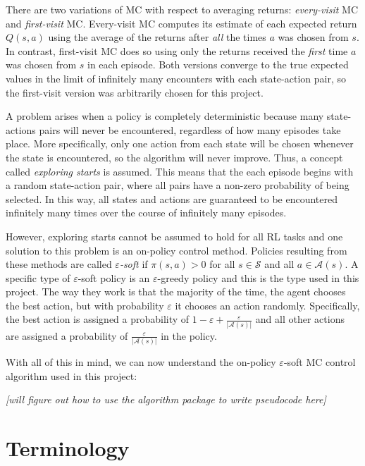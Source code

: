 \documentclass[11pt,a4paper]{report}
\begin{document}
There are two variations of MC with respect to averaging returns: \emph{every-visit} MC and \emph{first-visit} MC. Every-visit MC computes its estimate of each expected return $Q(s,a)$ using the average of the returns after \emph{all} the times $a$ was chosen from $s$. In contrast, first-visit MC does so using only the returns received the \emph{first} time $a$ was chosen from $s$ in each episode. Both versions converge to the true expected values in the limit of infinitely many encounters with each state-action pair, so the first-visit version was arbitrarily chosen for this project.

A problem arises when a policy is completely deterministic because many state-actions pairs will never be encountered, regardless of how many episodes take place. More specifically, only one action from each state will be chosen whenever the state is encountered, so the algorithm will never improve. Thus, a concept called \emph{exploring starts} is assumed. This means that the each episode begins with a random state-action pair, where all pairs have a non-zero probability of being selected. In this way, all states and actions are guaranteed to be encountered infinitely many times over the course of infinitely many episodes.

However, exploring starts cannot be assumed to hold for all RL tasks and one solution to this problem is an on-policy control method. Policies resulting from these methods are called \emph{$\varepsilon$-soft} if $\pi(s,a) > 0$ for all $s \in \mathcal{S}$ and all $a \in \mathcal{A}(s)$. A specific type of $\varepsilon$-soft policy is an $\varepsilon$-greedy policy and this is the type used in this project. The way they work is that the majority of the time, the agent chooses the best action, but with probability $\varepsilon$ it chooses an action randomly. Specifically, the best action is assigned a probability of $1 - \varepsilon + \frac{\varepsilon}{|\mathcal{A}(s)|}$ and all other actions are assigned a probability of $\frac{\varepsilon}{|\mathcal{A}(s)|}$ in the policy.

With all of this in mind, we can now understand the on-policy $\varepsilon$-soft MC control algorithm used in this project:

\label{sec:monteCarloPseudocode}
\begin{center}
	\emph{[will figure out how to use the algorithm package to write pseudocode here]}
\end{center}


\section{Terminology}
\label{sec:Terminology}
\end{document}
